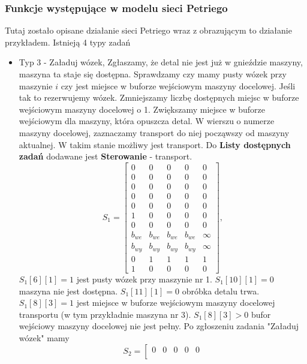 \documentclass[10pt, a4paper]{article}
\begin{document}
\subsubsection{Funkcje występujące w modelu sieci Petriego}
\label{funkcje}

Tutaj zostało opisane działanie sieci Petriego wraz z obrazującym to działanie przykładem.
\newline
Istnieją 4 typy zadań
\begin{itemize}

\item Typ 3 - Załaduj wózek,
Zgłaszamy, że detal nie jest już w gnieździe maszyny, maszyna ta staje się dostępna. Sprawdzamy czy mamy pusty wózek przy maszynie $i$ czy jest miejsce w buforze wejściowym maszyny docelowej. Jeśli tak to rezerwujemy wózek. Zmniejszamy liczbę dostępnych miejsc w buforze wejściowym maszyny docelowej o 1. Zwiększamy miejsce w buforze wejściowym dla maszyny, która opuszcza detal. W wierszu o numerze maszyny docelowej, zaznaczamy transport do niej począwszy od maszyny aktualnej. W takim stanie możliwy jest transport. Do \textbf{Listy dostępnych zadań} dodawane jest \textbf{Sterowanie} - transport.
\begin{equation*}
S_1=\left[\begin{array}{ccccc}
0 & 0 & 0 & 0&0\\
0 & 0 & 0 & 0 & 0\\
0 & 0 & 0 & 0& 0\\
0 & 0 & 0 & 0& 0\\
0 & 0 & 0 & 0& 0\\
1 & 0 & 0 & 0 & 0\\
0 & 0 & 0 & 0& 0\\
b_{we}& b_{we}& b_{we}& b_{we} & \infty\\
b_{wy}& b_{wy}& b_{wy}& b_{wy} & \infty\\
0& 1& 1& 1 & 1\\
1 & 0 & 0 & 0 & 0
\end{array}\right],
\end{equation*}
$S_1[6][1]=1$ jest pusty wózek przy maszynie nr 1. $S_1[10][1]=0$ maszyna nie jest dostępna. $S_1[11][1]=0$ obróbka detalu trwa. $S_1[8][3]=1$ jest miejsce w buforze wejściowym maszyny docelowej transportu (w tym przykładnie maszyna nr 3). $S_1[8][3]>0$ bufor wejściowy maszyny docelowej nie jest pełny. Po zgłoszeniu zadania "Załaduj wózek" mamy
\begin{equation*}
S_2=\left[\begin{array}{ccccc}
0 & 0 & 0 & 0&0\\

\end{array}
\end{equation*}
\end{itemize}
\end{document}

